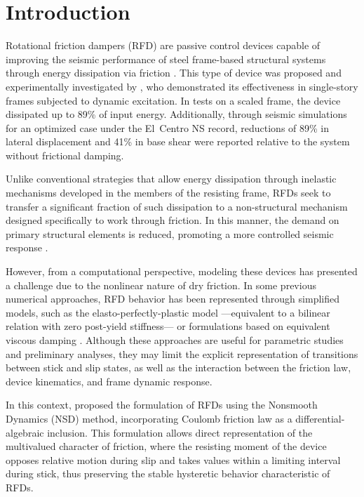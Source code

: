 \documentclass[preprint,12pt,authoryear]{elsarticle}
\begin{document}
\section{Introduction}
\label{sec:intro}

Rotational friction dampers (RFD) are passive control devices capable of improving
the seismic performance of steel frame-based structural systems through energy
dissipation via friction \citep{pall_friction_1980, pall_response_1982, jaisee_state---art_2021}.
This type of device was proposed and experimentally investigated by \citet{Mualla2002},
who demonstrated its effectiveness in single-story frames subjected to dynamic excitation.
In tests on a scaled frame, the device dissipated up to 89\% of input energy. Additionally,
through seismic simulations for an optimized case under the El~Centro NS record, reductions
of 89\% in lateral displacement and 41\% in base shear were reported relative to the
system without frictional damping.

Unlike conventional strategies that allow energy dissipation through inelastic mechanisms
developed in the members of the resisting frame, RFDs seek to transfer a significant
fraction of such dissipation to a non-structural mechanism designed specifically to work
through friction. In this manner, the demand on primary structural elements is reduced,
promoting a more controlled seismic response \citep{de_domenico_editorial_2020}.

However, from a computational perspective, modeling these devices has presented a challenge
due to the nonlinear nature of dry friction. In some previous numerical approaches, RFD
behavior has been represented through simplified models, such as the elasto-perfectly-plastic
model ---equivalent to a bilinear relation with zero post-yield stiffness--- or formulations
based on equivalent viscous damping \citep{lee_seismic_2025, Jarrahi2020jbe}. Although these
approaches are useful for parametric studies and preliminary analyses, they may limit the
explicit representation of transitions between stick and slip states, as well as the
interaction between the friction law, device kinematics, and frame dynamic response.

In this context, \citet{Namorado2024} proposed the formulation of RFDs using the
Nonsmooth Dynamics (NSD) method, incorporating Coulomb friction law as a differential-algebraic
inclusion. This formulation allows direct representation of the multivalued character of
friction, where the resisting moment of the device opposes relative motion during slip and
takes values within a limiting interval during stick, thus preserving the stable hysteretic
behavior characteristic of RFDs.
\end{document}
